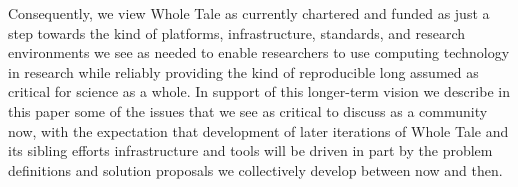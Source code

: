 Consequently, we view Whole Tale as currently chartered and funded as just a step
	towards the kind of platforms, infrastructure, standards, and research environments
	we see as needed to enable researchers to use computing technology in research
	while reliably providing the kind of reproducible long assumed as critical for
	science as a whole.
In support of this longer-term vision we describe in this paper some of the issues
	that we see as critical to discuss as a community now, with the expectation that
	development of later iterations of Whole Tale and its sibling efforts 
	infrastructure and tools will be driven in part by the problem definitions and
	solution proposals we collectively develop between now and then.



 
